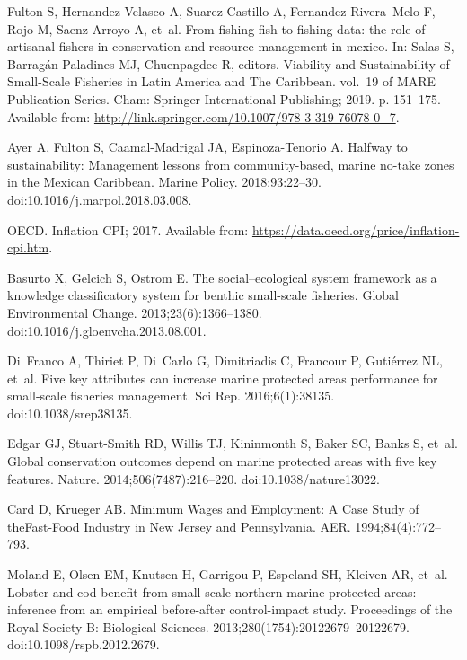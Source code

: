 \documentclass[10pt,letterpaper]{article}
\begin{document}
\begin{thebibliography}{10}
Fulton S, Hernandez-Velasco A, Suarez-Castillo A, Fernandez-Rivera~Melo F, Rojo
  M, Saenz-Arroyo A, et~al.
\newblock From fishing fish to fishing data: the role of artisanal fishers in
  conservation and resource management in mexico.
\newblock In: Salas S, Barragán-Paladines MJ, Chuenpagdee R, editors.
  Viability and Sustainability of Small-Scale Fisheries in Latin America and
  The Caribbean. vol.~19 of {MARE} Publication Series. Cham: Springer
  International Publishing; 2019. p. 151--175.
\newblock Available from:
  \url{http://link.springer.com/10.1007/978-3-319-76078-0\_7}.

Ayer A, Fulton S, Caamal-Madrigal JA, Espinoza-Tenorio A.
\newblock Halfway to sustainability: Management lessons from community-based,
  marine no-take zones in the Mexican Caribbean.
\newblock Marine Policy. 2018;93:22--30.
\newblock doi:{10.1016/j.marpol.2018.03.008}.

OECD. Inflation {CPI}; 2017.
\newblock Available from: \url{https://data.oecd.org/price/inflation-cpi.htm}.

Basurto X, Gelcich S, Ostrom E.
\newblock The social–ecological system framework as a knowledge
  classificatory system for benthic small-scale fisheries.
\newblock Global Environmental Change. 2013;23(6):1366--1380.
\newblock doi:{10.1016/j.gloenvcha.2013.08.001}.

Di~Franco A, Thiriet P, Di~Carlo G, Dimitriadis C, Francour P, Gutiérrez NL,
  et~al.
\newblock Five key attributes can increase marine protected areas performance
  for small-scale fisheries management.
\newblock Sci Rep. 2016;6(1):38135.
\newblock doi:{10.1038/srep38135}.

Edgar GJ, Stuart-Smith RD, Willis TJ, Kininmonth S, Baker SC, Banks S, et~al.
\newblock Global conservation outcomes depend on marine protected areas with
  five key features.
\newblock Nature. 2014;506(7487):216--220.
\newblock doi:{10.1038/nature13022}.

Card D, Krueger AB.
\newblock Minimum Wages and Employment: A Case Study of {theFast}-Food Industry
  in New Jersey and Pennsylvania.
\newblock AER. 1994;84(4):772--793.

Moland E, Olsen EM, Knutsen H, Garrigou P, Espeland SH, Kleiven AR, et~al.
\newblock Lobster and cod benefit from small-scale northern marine protected
  areas: inference from an empirical before-after control-impact study.
\newblock Proceedings of the Royal Society B: Biological Sciences.
  2013;280(1754):20122679--20122679.
\newblock doi:{10.1098/rspb.2012.2679}.


\end{thebibliography}
\end{document}
